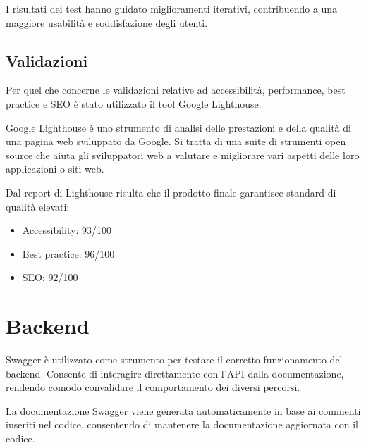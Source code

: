   I risultati dei test hanno guidato miglioramenti iterativi, contribuendo a una maggiore usabilità e soddisfazione degli utenti.

\subsection{Validazioni}

Per quel che concerne le validazioni relative ad accessibilità, performance, best practice e SEO è stato utilizzato il tool Google Lighthouse.

Google Lighthouse è uno strumento di analisi delle prestazioni e della qualità di una pagina web sviluppato da Google. Si tratta di una suite di strumenti open source che aiuta gli sviluppatori web a valutare e migliorare vari aspetti delle loro applicazioni o siti web.

Dal report di Lighthouse risulta che il prodotto finale garantisce standard di qualità elevati:

\begin{itemize}
  \item Accessibility: 93/100
  \item Best practice: 96/100
  \item SEO: 92/100
\end{itemize}

\section{Backend}
Swagger è utilizzato come strumento per testare il corretto funzionamento del backend. Consente di interagire direttamente con l'API dalla documentazione, rendendo comodo convalidare il comportamento dei diversi percorsi.

La documentazione Swagger viene generata automaticamente in base ai commenti inseriti nel codice, consentendo di mantenere la documentazione aggiornata con il codice.